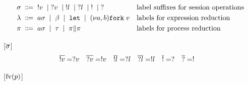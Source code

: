 \begin{align*}
  \sigma \; \Coloneqq \;\;&
    !v \; \mid \; ?v \; \mid \; !l \; \mid \; ?l \; \mid \; ! \; \mid \; ?
  && \text{label suffixes for session operations} \\
  \lambda \; \Coloneqq \;\;&
    a\sigma \; \mid \; \beta \; \mid \;  \mathtt{let} \; \mid \; (\nu a,b) \mathtt{fork}\; v
  &&\text{labels for expression reduction} \\
  \pi \; \Coloneqq \;\;&
               a\sigma
               \; \mid \; \tau
               \; \mid \; \pi \| \pi
  &&\text{labels for process reduction}
\end{align*}

[$\overline{\sigma}$]
\begin{align*}
  \overline{!v} &= ?v
  &\overline{ ?v} &= !v
  &\overline{ !l} &= ?l
  &\overline{ ?l} &= !l
  & \overline{!} &= ?
  &\overline{?} &= !
\end{align*}

[$\mathrm{fv}(p)$]

